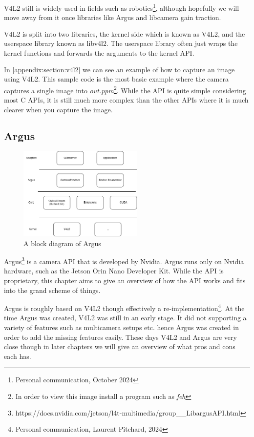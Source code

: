 V4L2 still is widely used in fields such as robotics\footnote{Personal
communication, October 2024}, although hopefully we will move away from it once
libraries like Argus and libcamera gain traction.

V4L2 is split into two libraries, the kernel side which is known as V4L2, and the
userspace library known as libv4l2. The userspace library often just wraps the
kernel functions and forwards the arguments to the kernel API.

In \cref{appendix:section:v4l2} we can see an example of how to capture an
image using V4L2. This sample code is the most basic example where the camera
captures a single image into \textit{out.ppm}\footnote{In order to view this
image install a program such as \textit{feh}}. While the API is quite simple
considering most C APIs, it is still much more complex than the other APIs
where it is much clearer when you capture the image.

\subsection{Argus}\label{section:argus}
\begin{figure}
    \begin{center}
        \includegraphics[width=0.55\textwidth]{figures/argus.png}
    \end{center}
    \caption{A block diagram of Argus}\label{fig:argusblock}
\end{figure}


Argus\footnote{https://docs.nvidia.com/jetson/l4t-multimedia/group\_\_LibargusAPI.html}
is a camera API that is developed by Nvidia. Argus runs only on Nvidia
hardware, such as the Jetson Orin Nano Developer Kit. While the API is
proprietary, this chapter aims to give an overview of how the API works and
fits into the grand scheme of things.

Argus is roughly based on V4L2 though effectively a re-implementation\footnote{Personal communication, Laurent Pitchard, 2024}.
At the time Argus was created, V4L2 was still in an early stage. It did not
supporting a variety of features such as multicamera setups etc. hence Argus
was created in order to add the missing features easily. These days V4L2 and
Argus are very close though in later chapters we will give an overview of what
pros and cons each has.

